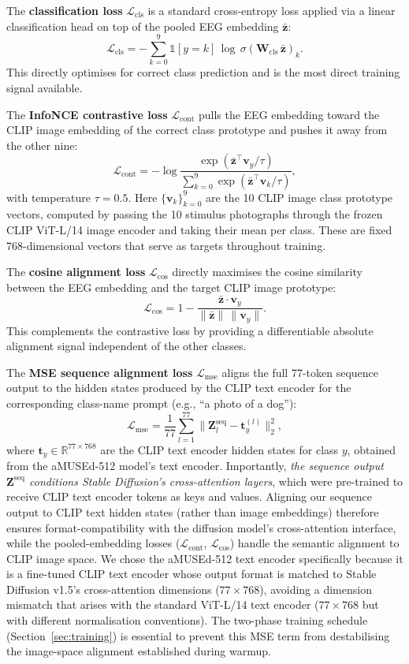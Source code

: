 \documentclass{article}
\begin{document}
The \textbf{classification loss} $\mathcal{L}_\mathrm{cls}$ is a standard cross-entropy loss applied via a linear classification head on top of the pooled EEG embedding $\bar{\mathbf{z}}$:
\[
\mathcal{L}_\mathrm{cls} = -\sum_{k=0}^{9} \mathbb{1}[y=k]\,\log\,\sigma(\mathbf{W}_\mathrm{cls}\,\bar{\mathbf{z}})_k.
\]
This directly optimises for correct class prediction and is the most direct training signal available.

The \textbf{InfoNCE contrastive loss} $\mathcal{L}_\mathrm{cont}$ pulls the EEG embedding toward the CLIP image embedding of the correct class prototype and pushes it away from the other nine:
\[
\mathcal{L}_\mathrm{cont} = -\log\frac{\exp(\bar{\mathbf{z}}^\top\mathbf{v}_y / \tau)}{\sum_{k=0}^{9} \exp(\bar{\mathbf{z}}^\top\mathbf{v}_k / \tau)},
\]
with temperature $\tau=0.5$. Here $\{\mathbf{v}_k\}_{k=0}^{9}$ are the 10 CLIP image class prototype vectors, computed by passing the 10 stimulus photographs through the frozen CLIP ViT-L/14 image encoder and taking their mean per class. These are fixed 768-dimensional vectors that serve as targets throughout training.

The \textbf{cosine alignment loss} $\mathcal{L}_\mathrm{cos}$ directly maximises the cosine similarity between the EEG embedding and the target CLIP image prototype:
\[
\mathcal{L}_\mathrm{cos} = 1 - \frac{\bar{\mathbf{z}} \cdot \mathbf{v}_y}{\|\bar{\mathbf{z}}\|\,\|\mathbf{v}_y\|}.
\]
This complements the contrastive loss by providing a differentiable absolute alignment signal independent of the other classes.

The \textbf{MSE sequence alignment loss} $\mathcal{L}_\mathrm{mse}$ aligns the full 77-token sequence output to the hidden states produced by the CLIP text encoder for the corresponding class-name prompt (e.g., ``a photo of a dog''):
\[
\mathcal{L}_\mathrm{mse} = \frac{1}{77}\sum_{l=1}^{77}\|\mathbf{Z}^{\text{seq}}_l - \mathbf{t}_y^{(l)}\|_2^2,
\]
where $\mathbf{t}_y \in \mathbb{R}^{77 \times 768}$ are the CLIP text encoder hidden states for class $y$, obtained from the aMUSEd-512 model's text encoder. Importantly, \emph{the sequence output $\mathbf{Z}^{\text{seq}}$ conditions Stable Diffusion's cross-attention layers}, which were pre-trained to receive CLIP text encoder tokens as keys and values. Aligning our sequence output to CLIP text hidden states (rather than image embeddings) therefore ensures format-compatibility with the diffusion model's cross-attention interface, while the pooled-embedding losses ($\mathcal{L}_\mathrm{cont}$, $\mathcal{L}_\mathrm{cos}$) handle the semantic alignment to CLIP image space. We chose the aMUSEd-512 text encoder specifically because it is a fine-tuned CLIP text encoder whose output format is matched to Stable Diffusion v1.5's cross-attention dimensions ($77 \times 768$), avoiding a dimension mismatch that arises with the standard ViT-L/14 text encoder ($77 \times 768$ but with different normalisation conventions). The two-phase training schedule (Section~\ref{sec:training}) is essential to prevent this MSE term from destabilising the image-space alignment established during warmup.
\end{document}
